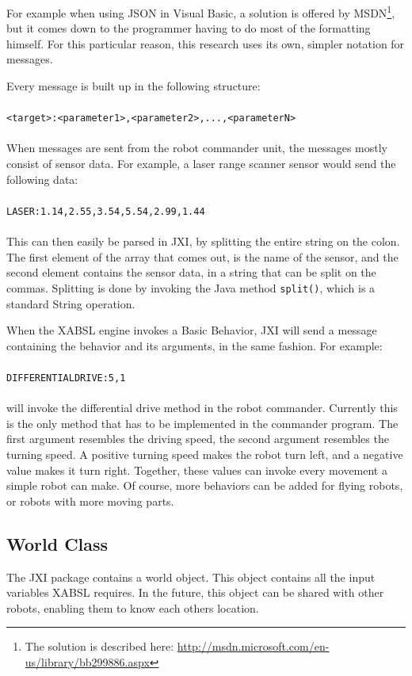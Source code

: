 \documentclass[a4paper,10pt]{article}
\begin{document}
For example when using JSON in Visual Basic, a solution is offered by
MSDN\footnote{The solution is described here: \url{
http://msdn.microsoft.com/en-us/library/bb299886.aspx}}, but it comes down to
the programmer  having to do most of the formatting himself. For this particular
reason, this research uses its own, simpler notation for messages. 

Every message is built up in the following structure: \\\\
\texttt{<target>:<parameter1>,<parameter2>,...,<parameterN>}\\\\
When messages are sent from the robot commander unit, the messages mostly
consist of sensor data. For example, a laser range scanner sensor would send the
following data:\\\\
\texttt{LASER:1.14,2.55,3.54,5.54,2.99,1.44}\\\\
This can then easily be parsed in JXI, by splitting the entire string on the
colon. The first element of the array that comes out, is the name of the sensor,
and the second element contains the sensor data, in a string that can be
split on the commas. Splitting is done by invoking the Java method
\texttt{split()}, which is a standard String operation. 

When the XABSL engine invokes a Basic Behavior, JXI will send a message
containing the behavior and its arguments, in the same fashion. For example:
\\\\
\texttt{DIFFERENTIALDRIVE:5,1}\\\\
will invoke the differential drive method in the robot commander. Currently this
is the only method that has to be implemented in the commander program. The
first argument resembles the driving speed, the second argument resembles the
turning speed. A positive turning speed makes the robot turn left, and a
negative value makes it turn right. Together, these values can invoke every
movement a simple robot can make. Of course, more behaviors can be added for
flying robots, or robots with more moving parts.

\subsection{World Class}
The JXI package contains a world object. This object contains all the input
variables XABSL requires. In the future, this object can be shared with other
robots, enabling them to know each others location. 
\end{document}
